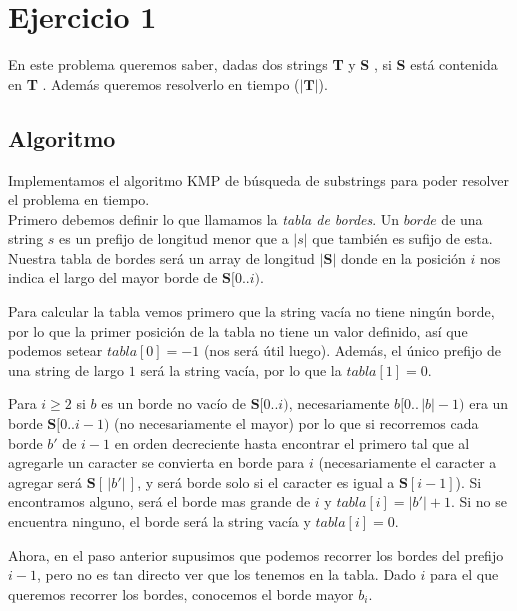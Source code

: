 \section{Ejercicio 1}

\newcommand\sS{ \textbf{S} }
\newcommand\sT{ \textbf{T} }

En este problema queremos saber, dadas dos strings \sT y \sS, si \sS está contenida en \sT. Además queremos resolverlo en tiempo \bigo($|\sT|$).

\subsection{Algoritmo}

Implementamos el algoritmo KMP de búsqueda de substrings para poder resolver el problema en tiempo.
\\

Primero debemos definir lo que llamamos la \textit{tabla de bordes}. Un $borde$ de una string $s$ es un prefijo de longitud menor que a $|s|$ que también es sufijo de esta. Nuestra tabla de bordes será un array de longitud $|\sS|$ donde en la posición $i$ nos indica el largo del mayor borde de $\sS[0..i)$.

    Para calcular la tabla vemos primero que la string vacía no tiene ningún borde, por lo que la primer posición de la tabla no tiene un valor definido, así que podemos setear $tabla[0] = -1$ (nos será útil luego). Además, el único prefijo de una string de largo $1$ será la string vacía, por lo que la $tabla[1] = 0$.

Para $i \geq 2$ si $b$ es un borde no vacío de $\sS[0..i)$, necesariamente $b[0.. \,|b|-1)$ era un borde $\sS[0..i-1)$ (no necesariamente el mayor) por lo que si recorremos cada borde $b'$ de $i-1$ en orden decreciente hasta encontrar el primero tal que al agregarle un caracter se convierta en borde para $i$ (necesariamente el caracter a agregar será $\sS[ \,|b'|\, ]$, y será borde solo si el caracter es igual a $\sS[i-1]$). Si encontramos alguno, será el borde mas grande de $i$ y $tabla[i] = |b'| + 1$. Si no se encuentra ninguno, el borde será la string vacía y $tabla[i] = 0$.

Ahora, en el paso anterior supusimos que podemos recorrer los bordes del prefijo $i-1$, pero no es tan directo ver que los tenemos en la tabla. Dado $i$ para el que queremos recorrer los bordes, conocemos el borde mayor $b_i$.

